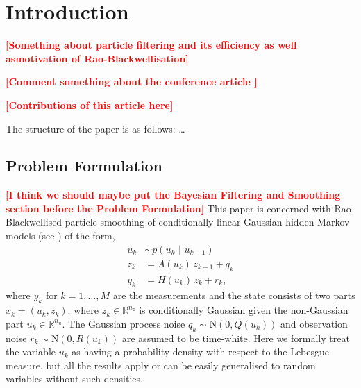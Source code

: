 \documentclass[twocolumn]{autart}    %
\newcommand{\comment}[1]{\textcolor{red}{\textbf{[#1]}}}
\begin{document}
\section{Introduction}
%
\comment{Something about particle filtering and its efficiency as well asmotivation of Rao-Blackwellisation}

\comment{Comment something about the conference article
  \cite{Sarkka+Bunch+Godsill:2012}}

\comment{Contributions of this article here}

The structure of the paper is as follows: \ldots


\subsection{Problem Formulation}
%
\comment{I think we should maybe put the Bayesian Filtering and Smoothing section before the Problem Formulation}
%
This paper is concerned with Rao-Blackwellised particle smoothing of conditionally linear Gaussian hidden Markov models
(see \cite{Doucet+Godsill+Andrieu:2000}) of the form,
%
\begin{equation}
\begin{split}
  u_k &\sim p(u_k \, \,|\, \, u_{k-1}) \\
  z_k &= A(u_{k}) \, z_{k-1} + q_{k} \\
  y_k &= H(u_k) \, z_{k} + r_{k},
\end{split}
\label{eq:condgauss}
\end{equation}
%
where $y_k$ for $k=1,\ldots,M$ are the measurements and the state consists of two parts $x_k = (u_k,z_k)$, where $z_k \in \mathbb{R}^{n_z}$ is conditionally Gaussian given the non-Gaussian part $u_k \in \mathbb{R}^{n_u}$. The Gaussian process noise $q_{k} \sim \mathrm{N}(0, Q(u_{k}))$ and observation noise $r_{k} \sim \mathrm{N}(0, R(u_{k}))$ are assumed to be time-white. Here we formally treat the variable $u_k$ as having a probability density with respect to the Lebesgue measure, but all the results apply or can be easily generalised to random variables without such densities.
\end{document}
